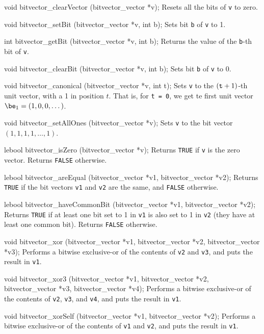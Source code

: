 void bitvector_clearVector (bitvector_vector *v);
\endcode
 \tab
Resets all the bits of {\tt v} to zero.
 \endtab
\code

void bitvector_setBit (bitvector_vector *v, int b);
\endcode
 \tab
Sets bit {\tt b} of {\tt v} to 1.
 \endtab
\code

int bitvector_getBit (bitvector_vector *v, int b);
\endcode
 \tab
Returns the value of the {\tt b}-th bit of {\tt v}.
 \endtab
\code

void bitvector_clearBit (bitvector_vector *v, int b);
\endcode
 \tab
Sets bit {\tt b} of {\tt v} to 0.
 \endtab
\code

void bitvector_canonical (bitvector_vector *v, int t);
\endcode
 \tab
Sets {\tt v} to the $({\tt t}+1)$-th unit vector, with a 1 in position $t$.
That is, for {\tt t = 0}, we get te first unit vector $\be_1 = (1,0,0,\dots)$.
 \endtab
\code

void bitvector_setAllOnes (bitvector_vector *v);
\endcode
 \tab
Sets {\tt v} to the bit vector $(1, 1, 1, 1,\dots , 1)$.
 \endtab
\code

lebool bitvector_isZero (bitvector_vector *v);
\endcode
 \tab
Returns {\tt TRUE} if {\tt v} is the zero vector.  Returns {\tt FALSE} otherwise.
\endtab
\code

lebool bitvector_areEqual (bitvector_vector *v1, bitvector_vector *v2);
\endcode
\tab
Returns {\tt TRUE} if the bit vectors {\tt v1} and {\tt v2} are the same,
and {\tt FALSE} otherwise.
\endtab
\code

lebool bitvector_haveCommonBit (bitvector_vector *v1, bitvector_vector *v2);
\endcode
 \tab
Returns {\tt TRUE} if at least one bit set to 1 in {\tt v1} is also set to 1 in {\tt v2}
(they have at least one common bit).  Returns {\tt FALSE} otherwise.
 \endtab
\code

void bitvector_xor (bitvector_vector *v1, bitvector_vector *v2, bitvector_vector *v3);
\endcode
 \tab
Performs a bitwise exclusive-or of the contents of \texttt{v2} and \texttt{v3},
and puts the result in \texttt{v1}.
\endtab
\code

void bitvector_xor3 (bitvector_vector *v1, bitvector_vector *v2,
                     bitvector_vector *v3, bitvector_vector *v4);
\endcode
 \tab
Performs a bitwise exclusive-or of the contents of \texttt{v2}, \texttt{v3}, and \texttt{v4},
and puts the result in \texttt{v1}.
 \endtab
\code

void bitvector_xorSelf (bitvector_vector *v1, bitvector_vector *v2);
\endcode
 \tab
Performs a bitwise exclusive-or of the contents of \texttt{v1} and \texttt{v2},
and puts the result in \texttt{v1}.
 \endtab
\code

